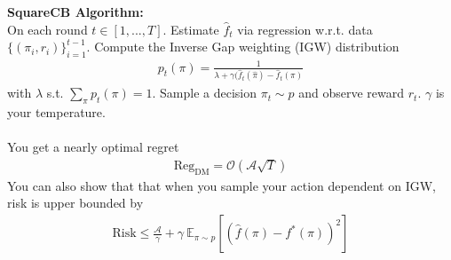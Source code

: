 \begin{sidework}
	\textbf{SquareCB Algorithm:}\\
	On each round $t \in [1, ..., T]$. Estimate $\hat f_t$ via regression w.r.t. data $\{(\pi_i, r_i)\}_{i=1}^{t-1}$. Compute the Inverse Gap weighting (IGW) distribution
	\begin{align}
		p_t(\pi) = \frac{1}{\lambda + \gamma (\hat f_t(\hat \pi) - \hat f_t(\pi)}
	\end{align}
	with $\lambda$ s.t. $\sum_\pi p_t(\pi) = 1$. Sample a decision $\pi_t \sim p$ and observe reward $r_t$. $\gamma$ is your temperature.\\
	\\
	You get a nearly optimal regret
	\begin{align}
		\text{Reg}_{\text{DM}} = \mathcal O(\mathcal A \sqrt{T})
	\end{align}
	You can also show that that when you sample your action dependent on IGW, risk is upper bounded by
	\begin{align}
		\text{Risk} \leq \frac{\mathcal A}{\gamma} + \gamma ~\mathbb E_{\pi \sim p} [(\hat f(\pi) - f^*(\pi))^2]
	\end{align}
\end{sidework}

